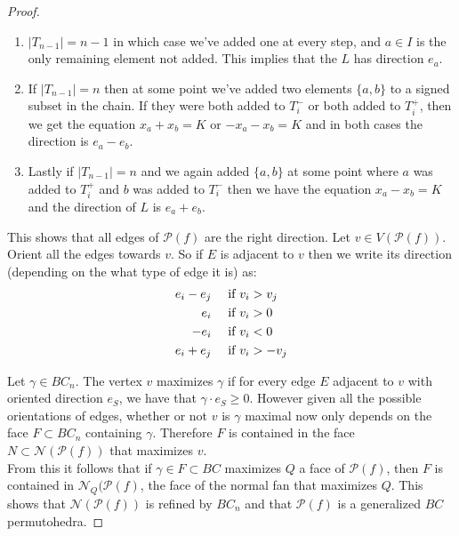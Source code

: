 \documentclass[12pt]{amsart}
\numberwithin{equation}{section}
\newcommand{\nn}{\mathcal{N}}
\newcommand{\pp}{\mathcal{P}}
\begin{document}
\begin{proof}
\begin{enumerate}[i]
 \item   $|T_{n-1}| = n-1$ in which case
we've added one at every step, and $a\in I$ is the only remaining element not added. This implies that the
$L$ has direction $e_a$.   

\item     If $|T_{n-1}|  = n$ then at some point we've added two elements $\{a,b\}$ to a signed subset in the chain.   
If they were both added to $T_i^-$ or both added to $T_i^+$, then we get the equation $x_a + x_b = K$
or $-x_a-x_b = K$ and in both cases the direction is $e_a-e_b$.   


\item
Lastly if  $|T_{n-1}|  = n$ and  we again added $\{a,b\}$ at some point where $a$ was added to $T_i^+$ and $b$ 
was added to $T_i^-$ then we have the equation $x_a-x_b =K$
and the direction of $L$ is $e_a+e_b$.

\end{enumerate}


This shows that all edges of $\pp(f)$ are the right direction.   
 Let $v\in V(\pp(f))$.    Orient all the edges towards $v$. So 
if $E$ is adjacent to $v$ then we write its direction (depending on the what type of edge it is) as:  
\begin{align*}
e_i-e_j 	& \quad   \text{ if $v_i>v_j$}\\
e_i  		&   \quad \text{ if $v_i > 0$} \\
-e_i  		&  \quad  \text{ if $v_i < 0$ }\\
e_i+e_j   	&  \quad \text{  if $ v_i > -v_j$} 
\end{align*}

Let $\gamma \in BC_n$.   The vertex $v$ maximizes $\gamma$ if for every edge $E$ adjacent
to $v$ with oriented direction $ e_S$, we have that $\gamma\cdot e_S \geq 0$.  However
given all the possible orientations of edges, whether or not $v$ is $\gamma$ maximal now
only depends on the face $F\subset BC_n$ containing $\gamma$.  Therefore $F$ is contained
in the face $N\subset \nn(\pp(f))$ that maximizes $v$.   \\

From this it follows that if $\gamma \in F\subset BC$ maximizes $Q$ a face of $\pp(f)$, 
then $F$ is contained in $\nn_Q(\pp(f)$, the face of the normal fan that maximizes $Q$. 
This shows that $\nn(\pp(f))$ is refined by $BC_n$ and that $\pp(f)$ is a generalized $BC$
permutohedra.  






\end{proof}
\end{document}
